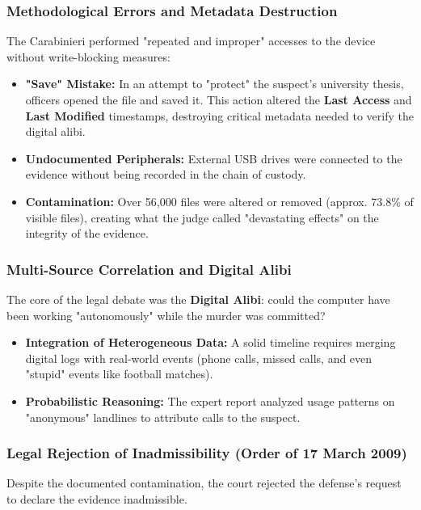 \subsubsection*{Methodological Errors and Metadata Destruction}
The Carabinieri performed "repeated and improper" accesses to the device without write-blocking measures:
\begin{itemize}
    \item \textbf{"Save" Mistake:} In an attempt to "protect" the suspect's university thesis, officers opened the file and saved it. This action altered the \textbf{Last Access} and \textbf{Last Modified} timestamps, destroying critical metadata needed to verify the digital alibi.
    \item \textbf{Undocumented Peripherals:} External USB drives were connected to the evidence without being recorded in the chain of custody.
    \item \textbf{Contamination:} Over 56,000 files were altered or removed (approx. 73.8\% of visible files), creating what the judge called "devastating effects" on the integrity of the evidence.
\end{itemize}

\subsubsection{Multi-Source Correlation and Digital Alibi}
The core of the legal debate was the \textbf{Digital Alibi}: could the computer have been working "autonomously" while the murder was committed?

\begin{itemize}
    \item \textbf{Integration of Heterogeneous Data:} A solid timeline requires merging digital logs with real-world events (phone calls, missed calls, and even "stupid" events like football matches).
    \item \textbf{Probabilistic Reasoning:} The expert report analyzed usage patterns on "anonymous" landlines to attribute calls to the suspect.
    \end{itemize}

\subsubsection{Legal Rejection of Inadmissibility (Order of 17 March 2009)}
Despite the documented contamination, the court rejected the defense's request to declare the evidence inadmissible.

